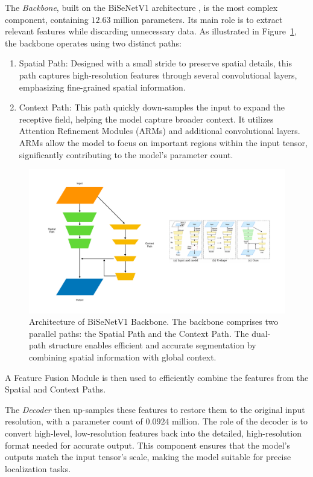 The \textit{Backbone}, built on the BiSeNetV1 architecture \cite{DBLP:journals/corr/abs-1808-00897}, is the most complex component, containing $12.63$ million parameters. Its main role is to extract relevant features while discarding unnecessary data. As illustrated in Figure~\ref{fig:bisenetv1}, the backbone operates using two distinct paths:
\begin{enumerate}
    \item Spatial Path: Designed with a small stride to preserve spatial details, this path captures high-resolution features through several convolutional layers, emphasizing fine-grained spatial information.
    \item Context Path: This path quickly down-samples the input to expand the receptive field, helping the model capture broader context. It utilizes Attention Refinement Modules (ARMs) and additional convolutional layers. ARMs allow the model to focus on important regions within the input tensor, significantly contributing to the model's parameter count.
\end{enumerate}
\begin{figure}[H]
    \centering
    \includegraphics[width=0.5\linewidth]{LateX//figs/bisenetv1.pdf}
    \caption{Architecture of BiSeNetV1 Backbone. The backbone comprises two parallel paths: the Spatial Path and the Context Path. The dual-path structure enables efficient and accurate segmentation by combining spatial information with global context.}
    \label{fig:bisenetv1}
\end{figure}
A Feature Fusion Module is then used to efficiently combine the features from the Spatial and Context Paths.

The \textit{Decoder} then up-samples these features to restore them to the original input resolution, with a parameter count of $0.0924$ million. The role of the decoder is to convert high-level, low-resolution features back into the detailed, high-resolution format needed for accurate output. This component ensures that the model’s outputs match the input tensor's scale, making the model suitable for precise localization tasks.

